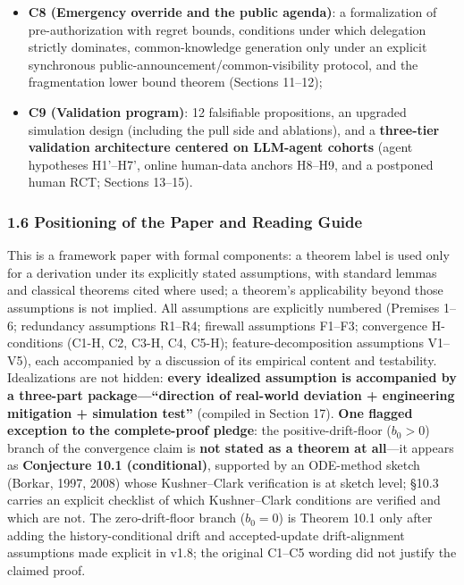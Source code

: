 \documentclass[
  11pt]{article}
\begin{document}
\begin{itemize}
  conjecture, steady-state neighborhood bounds, anti-Goodhart clauses,
  and the argued role of class-C judgment load (Section 10);
\item
  \textbf{C8 (Emergency override and the public agenda)}: a
  formalization of pre-authorization with regret bounds, conditions
  under which delegation strictly dominates, common-knowledge generation
  only under an explicit synchronous
  public-announcement/common-visibility protocol, and the fragmentation
  lower bound theorem (Sections 11--12);
\item
  \textbf{C9 (Validation program)}: 12 falsifiable propositions, an
  upgraded simulation design (including the pull side and ablations),
  and a \textbf{three-tier validation architecture centered on LLM-agent
  cohorts} (agent hypotheses H1'--H7', online human-data anchors H8--H9,
  and a postponed human RCT; Sections 13--15).
\end{itemize}

\subsubsection{1.6 Positioning of the Paper and Reading
Guide}\label{positioning-of-the-paper-and-reading-guide}

This is a framework paper with formal components: a theorem label is
used only for a derivation under its explicitly stated assumptions, with
standard lemmas and classical theorems cited where used; a theorem's
applicability beyond those assumptions is not implied. All assumptions
are explicitly numbered (Premises 1--6; redundancy assumptions R1--R4;
firewall assumptions F1--F3; convergence H-conditions (C1-H, C2, C3-H,
C4, C5-H); feature-decomposition assumptions V1--V5), each accompanied
by a discussion of its empirical content and testability. Idealizations
are not hidden: \textbf{every idealized assumption is accompanied by a
three-part package---``direction of real-world deviation + engineering
mitigation + simulation test''} (compiled in Section 17). \textbf{One
flagged exception to the complete-proof pledge}: the
positive-drift-floor (\(b_0>0\)) branch of the convergence claim is
\textbf{not stated as a theorem at all}---it appears as
\textbf{Conjecture 10.1 (conditional)}, supported by an ODE-method
sketch (Borkar, 1997, 2008) whose Kushner--Clark verification is at
sketch level; §10.3 carries an explicit checklist of which
Kushner--Clark conditions are verified and which are not. The
zero-drift-floor branch (\(b_0 = 0\)) is Theorem 10.1 only after adding
the history-conditional drift and accepted-update drift-alignment
assumptions made explicit in v1.8; the original C1--C5 wording did not
justify the claimed proof.
\end{document}
